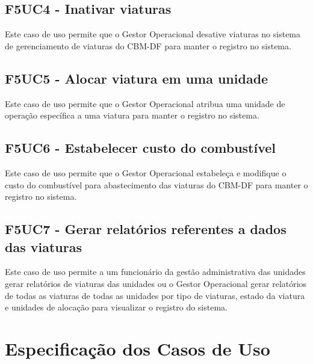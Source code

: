   \subsection{F5UC4 - Inativar viaturas}
Este caso de uso permite que o Gestor Operacional desative viaturas no sistema de gerenciamento de viaturas do CBM-DF para manter o registro no sistema.
  \subsection{F5UC5 - Alocar viatura em uma unidade}
Este caso de uso permite que o Gestor Operacional atribua uma unidade de operação específica a uma viatura para manter o registro no sistema.
  \subsection{F5UC6 - Estabelecer custo do combustível}
Este caso de uso permite que o Gestor Operacional estabeleça e modifique o custo do combustível para abastecimento das viaturas do CBM-DF para manter o registro no sistema.
  \subsection{F5UC7 - Gerar relatórios referentes a dados das viaturas}
Este caso de uso permite a um funcionário da gestão administrativa das unidades gerar relatórios de viaturas das unidades ou o Gestor Operacional gerar relatórios de todas as viaturas de todas as unidades por tipo de viaturas, estado da viatura e unidades de alocação para visualizar o registro do sistema.

 \section{Especificação dos Casos de Uso}